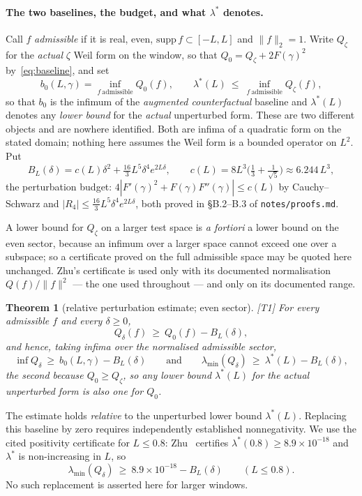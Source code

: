 \documentclass[11pt,a4paper]{article}
\newtheorem{theorem}{Theorem}
\theoremstyle{definition}
\theoremstyle{remark}
\newcommand{\tier}[1]{{\small\textsf{[#1]}}}
\newcommand{\lmin}{\lambda_{\min}}
\newcommand{\lstar}{\lambda^{*}}
\newcommand{\src}[1]{{\footnotesize\texttt{#1}}}
\begin{document}
\paragraph{The two baselines, the budget, and what $\lstar$ denotes.} Call $f$
\emph{admissible} if it is real, even, $\mathrm{supp}\,f\subset[-L,L]$ and $\|f\|_2=1$. Write
$Q_\zeta$ for the \emph{actual} $\zeta$ Weil form on the window, so that
$Q_0=Q_\zeta+2F(\gamma)^{2}$ by~\eqref{eq:baseline}, and set
\[
b_0(L,\gamma)=\inf_{f\ \mathrm{admissible}}Q_0(f),
\qquad
\lstar(L)\ \le\ \inf_{f\ \mathrm{admissible}}Q_\zeta(f),
\]
so that $b_0$ is the infimum of the \emph{augmented counterfactual} baseline and $\lstar(L)$
denotes any \emph{lower bound} for the \emph{actual} unperturbed form. These are two different
objects and are nowhere identified. Both are infima of a quadratic form on the stated domain;
nothing here assumes the Weil form is a bounded operator on $L^{2}$. Put
\[
B_L(\delta)=c(L)\delta^{2}+\tfrac{16}{3}L^{5}\delta^{4}e^{2L\delta},
\qquad c(L)=8L^{3}\bigl(\tfrac13+\tfrac1{\sqrt5}\bigr)\approx6.244\,L^{3},
\]
the perturbation budget: $4|F'(\gamma)^{2}+F(\gamma)F''(\gamma)|\le c(L)$ by Cauchy--Schwarz
and $|R_4|\le\tfrac{16}{3}L^{5}\delta^{4}e^{2L\delta}$, both proved in \S B.2--B.3 of
\src{notes/proofs.md}.

A lower bound for $Q_\zeta$ on a larger test space is \emph{a fortiori} a lower bound on the
even sector, because an infimum over a larger space cannot exceed one over a subspace; so a
certificate proved on the full admissible space may be quoted here unchanged. Zhu's
certificate is used only with its documented normalisation $Q(f)/\|f\|^{2}$ --- the one used
throughout --- and only on its documented range.

\begin{theorem}[relative perturbation estimate; even sector]\label{thm:zeta}\tier{T1}
For every admissible $f$ and every $\delta\ge0$,
\[
Q_\delta(f)\ \ge\ Q_0(f)-B_L(\delta),
\]
and hence, taking infima over the normalised admissible sector,
\[
\inf Q_\delta\ \ge\ b_0(L,\gamma)-B_L(\delta)
\qquad\text{and}\qquad
\lmin(Q_\delta)\ \ge\ \lstar(L)-B_L(\delta),
\]
the second because $Q_0\ge Q_\zeta$, so any lower bound $\lstar(L)$ for the actual unperturbed
form is also one for $Q_0$.
\end{theorem}

The estimate holds \emph{relative} to the unperturbed lower bound $\lstar(L)$. Replacing this
baseline by zero requires independently established nonnegativity. We use the cited positivity
certificate for $L\le0.8$: Zhu~\cite{Zhu} certifies $\lstar(0.8)\ge8.9\times10^{-18}$ and
$\lstar$ is non-increasing in $L$, so
\[
\lmin(Q_\delta)\ \ge\ 8.9\times10^{-18}-B_L(\delta)
\qquad (L\le0.8).
\]
No such replacement is asserted here for larger windows.
\end{document}
